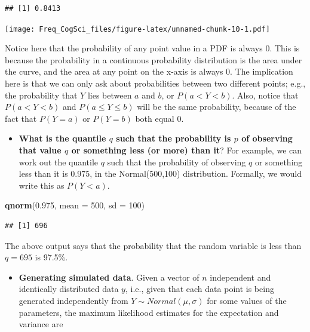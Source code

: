 \documentclass[12pt,]{krantz}
\newenvironment{Shaded}{\begin{snugshade}}{\end{snugshade}}
\newcommand{\DataTypeTok}[1]{\textcolor[rgb]{0.13,0.29,0.53}{#1}}
\newcommand{\DecValTok}[1]{\textcolor[rgb]{0.00,0.00,0.81}{#1}}
\newcommand{\FloatTok}[1]{\textcolor[rgb]{0.00,0.00,0.81}{#1}}
\newcommand{\KeywordTok}[1]{\textcolor[rgb]{0.13,0.29,0.53}{\textbf{#1}}}
\newcommand{\NormalTok}[1]{#1}
\providecommand{\tightlist}{%
  \setlength{\itemsep}{0pt}\setlength{\parskip}{0pt}}
\begin{document}
\begin{verbatim}
## [1] 0.8413
\end{verbatim}

\texttt{[image: Freq\_CogSci\_files/figure-latex/unnamed-chunk-10-1.pdf]}

Notice here that the probability of any point value in a PDF is always 0. This is because the probability in a continuous probability distribution is the area under the curve, and the area at any point on the x-axis is always 0. The implication here is that we can only ask about probabilities between two different points; e.g., the probability that \(Y\) lies between \(a\) and \(b\), or \(P(a<Y<b)\). Also, notice that \(P(a<Y<b)\) and \(P(a\leq Y\leq b)\) will be the same probability, because of the fact that \(P(Y=a)\) or \(P(Y=b)\) both equal 0.

\begin{itemize}
\tightlist
\item
  \textbf{What is the quantile \(q\) such that the probability is \(p\) of observing that value \(q\) or something less (or more) than it}? For example, we can work out the quantile \(q\) such that the probability of observing \(q\) or something less than it is 0.975, in the Normal(500,100) distribution. Formally, we would write this as \(P(Y<a)\).
\end{itemize}

\begin{Shaded}
\begin{Highlighting}[]
\KeywordTok{qnorm}\NormalTok{(}\FloatTok{0.975}\NormalTok{, }\DataTypeTok{mean =} \DecValTok{500}\NormalTok{, }\DataTypeTok{sd =} \DecValTok{100}\NormalTok{)}
\end{Highlighting}
\end{Shaded}

\begin{verbatim}
## [1] 696
\end{verbatim}

The above output says that the probability that the random variable is less than \(q=695\) is 97.5\%.

\begin{itemize}
\tightlist
\item
  \textbf{Generating simulated data}. Given a vector of \(n\) independent and identically distributed data \(y\), i.e., given that each data point is being generated independently from \(Y \sim Normal(\mu,\sigma)\) for some values of the parameters, the maximum likelihood estimates for the expectation and variance are
\end{itemize}
\end{document}
